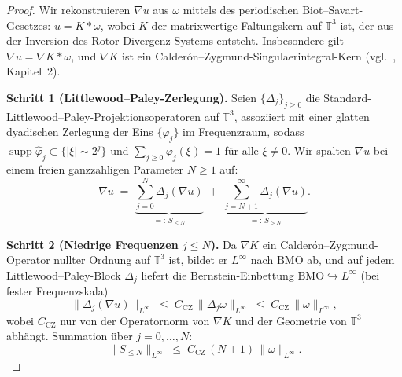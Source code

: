\documentclass[12pt,a4paper]{article}
\theoremstyle{definition}
\theoremstyle{plain}
\theoremstyle{remark}
\begin{document}
\begin{proof}
Wir rekonstruieren $\nabla u$ aus $\omega$ mittels des periodischen Biot--Savart-Gesetzes:
$u = K * \omega$, wobei $K$ der matrixwertige Faltungskern auf
$\mathbb{T}^3$ ist, der aus der Inversion des Rotor-Divergenz-Systems entsteht.
Insbesondere gilt $\nabla u = \nabla K * \omega$, und $\nabla K$ ist ein
Calder\'{o}n--Zygmund-Singulaerintegral-Kern (vgl.\ \cite{BertozziMajda2002},
Kapitel~2).

\medskip
\noindent\textbf{Schritt 1 (Littlewood--Paley-Zerlegung).}
Seien $\{\Delta_j\}_{j\ge 0}$ die Standard-Littlewood--Paley-Projektionsoperatoren
auf $\mathbb{T}^3$, assoziiert mit einer glatten dyadischen Zerlegung der Eins
$\{\varphi_j\}$ im Frequenzraum, sodass
$\operatorname{supp}\hat\varphi_j \subset \{|\xi| \sim 2^j\}$ und
$\sum_{j\ge 0}\varphi_j(\xi) = 1$ für alle $\xi \neq 0$.
Wir spalten $\nabla u$ bei einem freien ganzzahligen Parameter $N \ge 1$ auf:
\[
    \nabla u \;=\; \underbrace{\sum_{j=0}^{N} \Delta_j(\nabla u)}_{=:\,S_{\le N}}
                  \;+\; \underbrace{\sum_{j=N+1}^{\infty} \Delta_j(\nabla u)}_{=:\,S_{>N}}.
\]

\medskip
\noindent\textbf{Schritt 2 (Niedrige Frequenzen $j \le N$).}
Da $\nabla K$ ein Calder\'{o}n--Zygmund-Operator nullter Ordnung auf
$\mathbb{T}^3$ ist, bildet er $L^\infty$ nach $\mathrm{BMO}$ ab, und auf jedem Littlewood--Paley-Block $\Delta_j$ liefert die Bernstein-Einbettung
$\mathrm{BMO} \hookrightarrow L^\infty$ (bei fester Frequenzskala)
\[
    \|\Delta_j(\nabla u)\|_{L^\infty}
    \;\le\; C_{\mathrm{CZ}}\,\|\Delta_j \omega\|_{L^\infty}
    \;\le\; C_{\mathrm{CZ}}\,\|\omega\|_{L^\infty},
\]
wobei $C_{\mathrm{CZ}}$ nur von der Operatornorm von $\nabla K$ und
der Geometrie von $\mathbb{T}^3$ abhängt. Summation über $j = 0, \ldots, N$:
\begin{equation}\label{eq:BS-low}
    \|S_{\le N}\|_{L^\infty}
    \;\le\; C_{\mathrm{CZ}}\,(N+1)\,\|\omega\|_{L^\infty}.
\end{equation}


\end{proof}
\end{document}
